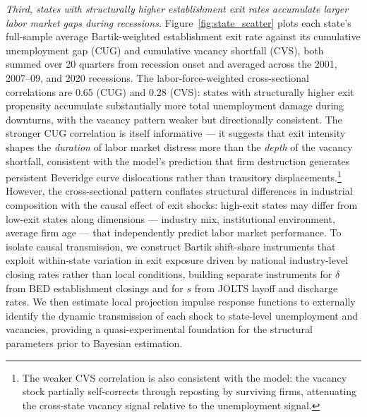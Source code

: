\documentclass[authoryear, review, 12pt]{elsarticle}
\begin{document}
	\textit{Third, states with structurally higher establishment exit rates 
	accumulate larger labor market gaps during recessions.} 
	Figure~\ref{fig:state_scatter} plots each state's full-sample 
	average Bartik-weighted establishment exit rate against its 
	cumulative unemployment gap (CUG) and cumulative vacancy shortfall 
	(CVS), both summed over 20 quarters from recession onset and 
	averaged across the 2001, 2007--09, and 2020 recessions. The 
	labor-force-weighted cross-sectional correlations are 0.65 (CUG) 
	and 0.28 (CVS): states with structurally higher exit propensity 
	accumulate substantially more total unemployment damage during 
	downturns, with the vacancy pattern weaker but directionally 
	consistent. The stronger CUG correlation is itself informative --- 
	it suggests that exit intensity shapes the \emph{duration} of 
	labor market distress more than the \emph{depth} of the vacancy 
	shortfall, consistent with the model's prediction that firm 
	destruction generates persistent Beveridge curve dislocations 
	rather than transitory displacements.\footnote{The weaker CVS 
		correlation is also consistent with the model: the vacancy stock 
		partially self-corrects through reposting by surviving firms, 
		attenuating the cross-state vacancy signal relative to the 
		unemployment signal.} However, the cross-sectional pattern 
	conflates structural differences in industrial composition with 
	the causal effect of exit shocks: high-exit states may differ 
	from low-exit states along dimensions --- industry mix, 
	institutional environment, average firm age --- that independently 
	predict labor market performance. To isolate causal transmission, 
	we construct Bartik shift-share instruments 
	that exploit within-state variation in exit exposure driven by 
	national industry-level closing rates rather than local conditions, 
	building separate instruments for $\delta$ from BED establishment 
	closings and for $s$ from JOLTS layoff and discharge rates. We 
	then estimate local projection impulse response functions to 
	externally identify the dynamic transmission of each shock to 
	state-level unemployment and vacancies, providing a 
	quasi-experimental foundation for the structural parameters prior 
	to Bayesian estimation.
\end{document}
